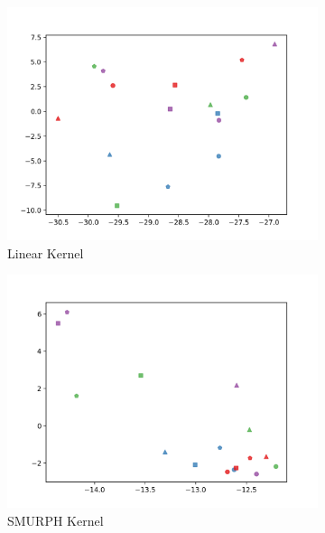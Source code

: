 \documentclass[10pt]{article}
\begin{document}
\begin{figure}[H]
    \centering
    \begin{subfigure}[h]{0.3\textwidth}
        \includegraphics[width=\linewidth]{mh_linear}
        \caption{Linear Kernel}
    \end{subfigure}
    \begin{subfigure}[h]{0.3\textwidth}
        \includegraphics[width=\linewidth]{mh_smurf}
        \caption{SMURPH Kernel}
    \end{subfigure}%
    \begin{subfigure}[h]{0.3\textwidth}

\end{subfigure}
\end{figure}
\end{document}
